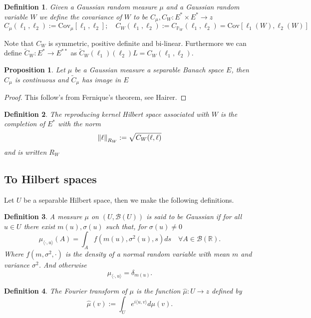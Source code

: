 \documentclass[12pt]{article}
\newcommand{\R}zzzzz
\newtheorem{proposition}{Proposition}
\newtheorem{definition}{Definition}
\begin{document}
\begin{definition}
	Given a Gaussian random measure $\mu$ and a Gaussian random variable $W$ we define the covariance of $W$ to be $C_\mu,C_W:E^*\times E^*\to \R$
	\begin{equation*}
		C_\mu(\ell_1,\ell_2):=\mathrm{Cov}_\mu[\ell_1,\ell_2];\quad C_W(\ell_1,\ell_2):=C_{\mathbb{P}_W}(\ell_1,\ell_2)=\mathrm{Cov}[\ell_1(W),\ell_2(W)]
	\end{equation*}
\end{definition}
Note that $C_W$ is symmetric, positive definite and bi-linear. Furthermore we can define $\tilde{C}_W:E^*\to E^{**}$ as $\tilde{C}_W(\ell_1)(\ell_2)L={C}_W(\ell_1,\ell_2)$.
\begin{proposition}
	Let $\mu$ be a Gaussian measure a separable Banach space $E$, then $C_\mu$ is continuous and $\tilde{C}_\mu$ has image in $E$
\end{proposition}
\begin{proof}
	This follow's from Fernique's theorem, see Hairer.
\end{proof}
\begin{definition}
	The \emph{reproducing kernel Hilbert space associated with $W$} is the completion of $E^*$ with the norm
	\begin{equation*}
		\norm{\ell}_{R_W}:=\sqrt{ C_W(\ell,\ell)}
	\end{equation*}
	and is written $R_W$
\end{definition}
\subsection{To Hilbert spaces}
Let $U$ be a separable Hilbert space, then we make the following definitions.
\begin{definition}\label{Gaussian measure}
	A measure $\mu$ on  \((U,\mathcal{B}(U))\) is said to be Gaussian if
	for all \(u\in U\) there exist \(m(u),\sigma(u)\) such that, for \(\sigma(u)\neq 0\)
	\[\mu_{\langle\cdot,u\rangle}(A)=\int_A f(m(u),\sigma^2(u),s)ds\quad\forall A\in\mathcal{B}(\mathbb{R}).\]
	Where $f(m,\sigma^2,\cdot)$ is the density of a normal random variable with mean $m$ and variance $\sigma^2$.
	And otherwise
	\[\mu_{\langle\cdot,u\rangle}=\delta_{m(u)}.\]
\end{definition}
\begin{definition}
	The Fourier transform of $\mu$ is the function $\hat{\mu}:U\to\R$ defined by
	\[\hat{\mu}(v):=\int_U e^{i\langle u,v\rangle}d\mu(v).\]
\end{definition}
\end{document}
